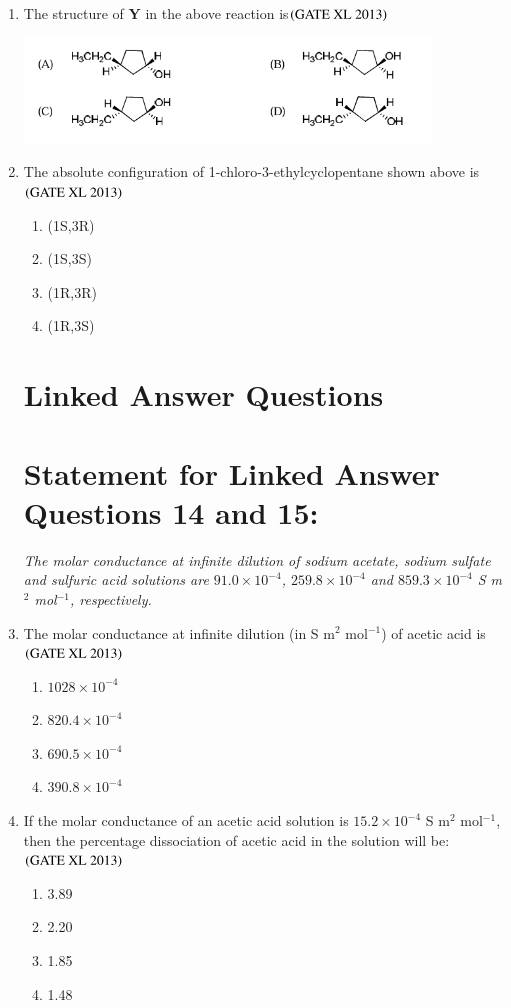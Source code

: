 \documentclass[journal]{IEEEtran}
\begin{document}
\begin{enumerate}
\item The structure of \textbf{Y} in the above reaction is\hfill $\left(\text{GATE XL 2013}\right)$
\begin{center}
    \includegraphics[width=0.85\textwidth]{figs/Screenshot 2025-08-05 115721.png}
\end{center}

\item The absolute configuration of 1-chloro-3-ethylcyclopentane shown above is\hfill $\left(\text{GATE XL 2013}\right)$
\begin{enumerate}
    \item (1S,3R)
    \item (1S,3S)
    \item (1R,3R)
    \item (1R,3S)
\end{enumerate}

\section*{Linked Answer Questions}
\section*{Statement for Linked Answer Questions 14 and 15: }

\noindent\textit{The molar conductance at infinite dilution of sodium acetate, sodium sulfate and sulfuric acid solutions are $91.0 \times 10^{-4}$, $259.8 \times 10^{-4}$ and $859.3 \times 10^{-4}$ S m$^2$ mol$^{-1}$, respectively.}

\item The molar conductance at infinite dilution (in S m$^2$ mol$^{-1}$) of acetic acid is\hfill $\left(\text{GATE XL 2013}\right)$
\begin{enumerate}
    \item $1028 \times 10^{-4}$
    \item $820.4 \times 10^{-4}$
    \item $690.5 \times 10^{-4}$
    \item $390.8 \times 10^{-4}$
\end{enumerate}

\item If the molar conductance of an acetic acid solution is $15.2 \times 10^{-4}$ S m$^2$ mol$^{-1}$, then the percentage dissociation of acetic acid in the solution will be:\hfill $\left(\text{GATE XL 2013}\right)$
\begin{enumerate}
    \item 3.89
    \item 2.20
    \item 1.85
    \item 1.48
\end{enumerate}


\end{enumerate}
\end{document}
